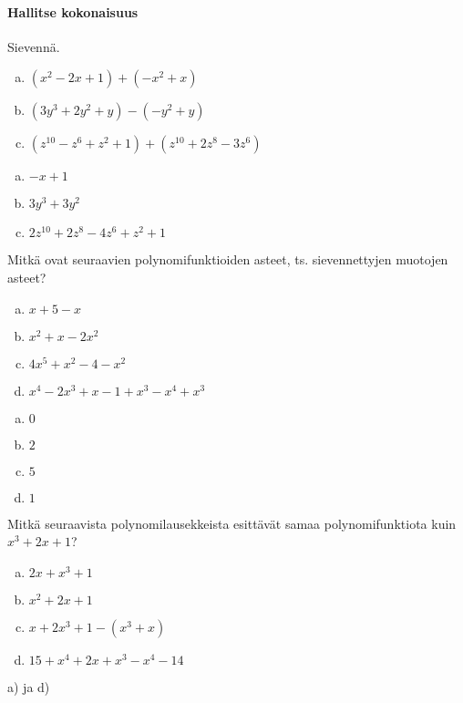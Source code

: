 \begin{tehtavasivu}
\paragraph*{Hallitse kokonaisuus}

\begin{tehtava}
    Sievennä.
    \begin{enumerate}[a)]
        \item $(x^2 - 2x + 1) + (-x^2 + x) $
        \item $(3y^3 + 2y^2  + y) - (-y^2 + y)$
        \item $(z^{10} - z^6 + z^2 + 1) + (z^{10} + 2z^8 - 3z^6)$
    \end{enumerate}
    \begin{vastaus}
        \begin{enumerate}[a)]
            \item $-x + 1$
            \item $3y^3 + 3y^2$
            \item $2z^{10} + 2z^8 - 4z^6 + z^2 + 1$
        \end{enumerate}
    \end{vastaus}
\end{tehtava}

\begin{tehtava}
	Mitkä ovat seuraavien polynomifunktioiden asteet, ts. sievennettyjen muotojen asteet?
	\begin{enumerate}[a)]
		\item $x+5-x$
		\item $x^2+x-2x^2$
		\item $4x^5+x^2-4-x^2$
		\item $x^4-2x^3+x-1+x^3-x^4+x^3$
	\end{enumerate}

	\begin{vastaus}
		\begin{enumerate}[a)]
			\item $0$
			\item $2$
			\item $5$
			\item $1$
		\end{enumerate}
	\end{vastaus}
\end{tehtava}

\begin{tehtava}
	Mitkä seuraavista polynomilausekkeista esittävät samaa polynomifunktiota kuin
	$x^3+2x+1$?
	\begin{enumerate}[a)]
		\item $2x+x^3+1$
		\item $x^2+2x+1$
		\item $x+2x^3+1 - (x^3+x)$
		\item $15+x^4+2x+x^3-x^4-14$
	\end{enumerate}
	\begin{vastaus}
		a) ja d)
	\end{vastaus}
\end{tehtava}


\end{tehtavasivu}
